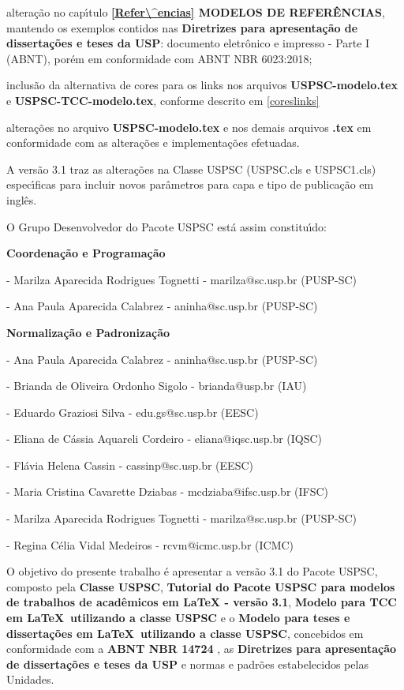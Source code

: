 \begin{alineas}
	\item altera\c{c}\~ao no cap\'{\i}tulo \textbf{\ref{Refer\^encias} MODELOS DE REFER\^ENCIAS}, mantendo os exemplos contidos nas \textbf{Diretrizes para apresenta\c{c}\~ao de disserta\c{c}\~oes e teses da USP}: documento eletr\^onico e impresso - Parte I (ABNT), por\'em em conformidade com ABNT NBR 6023:2018; 
	\item inclus\~ao da alternativa de cores para os links nos arquivos \textbf{USPSC-modelo.tex} e \textbf{USPSC-TCC-modelo.tex}, conforme descrito em \ref{coreslinks} 
	\item altera\c{c}\~oes no arquivo \textbf{USPSC-modelo.tex} e nos demais arquivos \textbf{.tex} em conformidade com as altera\c{c}\~oes e implementa\c{c}\~oes efetuadas.	\\
\end{alineas}

	A vers\~ao 3.1 traz as altera\c{c}\~oes na Classe USPSC (USPSC.cls e USPSC1.cls) espec\'{\i}ficas para incluir novos par\^ametros para capa e tipo de publica\c{c}\~ao em ingl\^es.

	O Grupo Desenvolvedor do Pacote USPSC est\'a assim constitu\'{\i}do:

\textbf{Coordena\c{c}\~ao e Programa\c{c}\~ao}

- Marilza Aparecida Rodrigues Tognetti - marilza@sc.usp.br (PUSP-SC)	

- Ana Paula Aparecida Calabrez - aninha@sc.usp.br (PUSP-SC) 

\textbf{Normaliza\c{c}\~ao e Padroniza\c{c}\~ao}

- Ana Paula Aparecida Calabrez - aninha@sc.usp.br (PUSP-SC)

- Brianda de Oliveira Ordonho Sigolo - brianda@usp.br (IAU)

- Eduardo Graziosi Silva - edu.gs@sc.usp.br (EESC)

- Eliana de C\'assia Aquareli Cordeiro - eliana@iqsc.usp.br (IQSC)

- Fl\'avia Helena Cassin - cassinp@sc.usp.br (EESC)	

- Maria Cristina Cavarette Dziabas - mcdziaba@ifsc.usp.br (IFSC)	

- Marilza Aparecida Rodrigues Tognetti - marilza@sc.usp.br (PUSP-SC)

- Regina C\'elia Vidal Medeiros - rcvm@icmc.usp.br (ICMC)

	O objetivo do presente trabalho \'e apresentar a vers\~ao 3.1 do Pacote USPSC, composto pela \textbf{Classe USPSC}, \textbf{Tutorial do Pacote USPSC para modelos de trabalhos de acad\^emicos em LaTeX - vers\~ao 3.1},  \textbf{Modelo para TCC em \LaTeX\ utilizando a classe USPSC} e o \textbf{Modelo para teses e disserta\c{c}\~oes em \LaTeX\ utilizando a classe USPSC}, concebidos em conformidade com a \textbf{ABNT NBR 14724} \cite{nbr14724}, as \textbf{Diretrizes para apresenta\c{c}\~ao de disserta\c{c}\~oes e teses da USP} \cite{aguia2020} e normas e padr\~oes estabelecidos pelas Unidades. 
	
